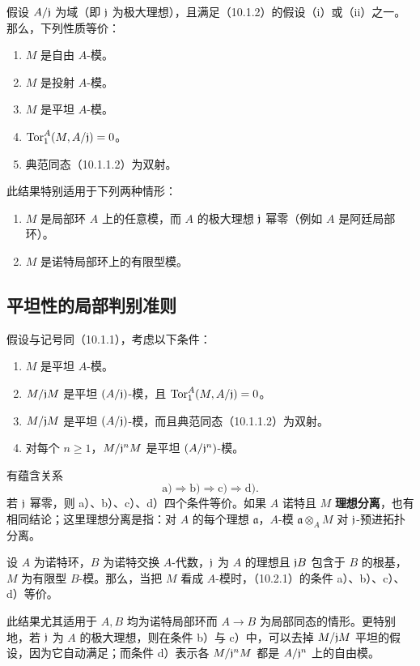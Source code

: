假设 $A/\mathfrak j$ 为域（即 $\mathfrak j$ 为极大理想），且满足（10.1.2）的假设（i）或（ii）之一。那么，下列性质等价：
\begin{enumerate}[label=\alph*)]
\item $M$ 是自由 $A$-模。
\item $M$ 是投射 $A$-模。
\item $M$ 是平坦 $A$-模。
\item $\operatorname{Tor}_1^A(M,A/\mathfrak j)=0$。
\item 典范同态（10.1.1.2）为双射。
\end{enumerate}
此结果特别适用于下列两种情形：
\begin{enumerate}[label=(\roman*)]
\item $M$ 是局部环 $A$ 上的任意模，而 $A$ 的极大理想 $\mathfrak j$ 幂零（例如 $A$ 是阿廷局部环）。
\item $M$ 是诺特局部环上的有限型模。
\end{enumerate}

\subsection{平坦性的局部判别准则}
假设与记号同（10.1.1），考虑以下条件：
\begin{enumerate}[label=\alph*)]
\item $M$ 是平坦 $A$-模。
\item $M/\mathfrak j M$ 是平坦 $(A/\mathfrak j)$-模，且 $\operatorname{Tor}_1^A(M,A/\mathfrak j)=0$。
\item $M/\mathfrak j M$ 是平坦 $(A/\mathfrak j)$-模，而且典范同态（10.1.1.2）为双射。
\item 对每个 $n\geq1$，$M/\mathfrak j^nM$ 是平坦 $(A/\mathfrak j^n)$-模。
\end{enumerate}
有蕴含关系
\[
\mathrm{a)}\Longrightarrow\mathrm{b)}\Longrightarrow\mathrm{c)}\Longrightarrow\mathrm{d)}.
\]
若 $\mathfrak j$ 幂零，则 a）、b）、c）、d）四个条件等价。如果 $A$ 诺特且 $M$ \textbf{理想分离}，也有相同结论；这里理想分离是指：对 $A$ 的每个理想 $\mathfrak a$，$A$-模 $\mathfrak a\otimes_A M$ 对 $\mathfrak j$-预进拓扑分离。

设 $A$ 为诺特环，$B$ 为诺特交换 $A$-代数，$\mathfrak j$ 为 $A$ 的理想且 $\mathfrak j B$ 包含于 $B$ 的根基，$M$ 为有限型 $B$-模。那么，当把 $M$ 看成 $A$-模时，（10.2.1）的条件 a）、b）、c）、d）等价。

此结果尤其适用于 $A,B$ 均为诺特局部环而 $A\to B$ 为局部同态的情形。更特别地，若 $\mathfrak j$ 为 $A$ 的极大理想，则在条件 b）与 c）中，可以去掉 $M/\mathfrak j M$ 平坦的假设，因为它自动满足；而条件 d）表示各 $M/\mathfrak j^nM$ 都是 $A/\mathfrak j^n$ 上的自由模。

